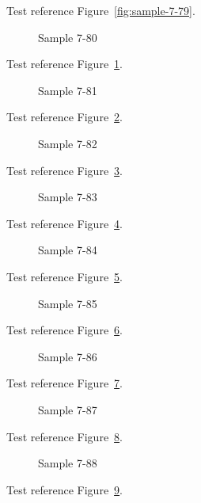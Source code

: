 Test reference Figure~\ref{fig:sample-7-79}.

\begin{figure}[tbhp]
\caption{Sample 7-80}
\label{fig:sample-7-80}
\end{figure}

Test reference Figure~\ref{fig:sample-7-80}.

\begin{figure}[tbhp]
\caption{Sample 7-81}
\label{fig:sample-7-81}
\end{figure}

Test reference Figure~\ref{fig:sample-7-81}.

\begin{figure}[tbhp]
\caption{Sample 7-82}
\label{fig:sample-7-82}
\end{figure}

Test reference Figure~\ref{fig:sample-7-82}.

\begin{figure}[tbhp]
\caption{Sample 7-83}
\label{fig:sample-7-83}
\end{figure}

Test reference Figure~\ref{fig:sample-7-83}.

\begin{figure}[tbhp]
\caption{Sample 7-84}
\label{fig:sample-7-84}
\end{figure}

Test reference Figure~\ref{fig:sample-7-84}.

\begin{figure}[tbhp]
\caption{Sample 7-85}
\label{fig:sample-7-85}
\end{figure}

Test reference Figure~\ref{fig:sample-7-85}.

\begin{figure}[tbhp]
\caption{Sample 7-86}
\label{fig:sample-7-86}
\end{figure}

Test reference Figure~\ref{fig:sample-7-86}.

\begin{figure}[tbhp]
\caption{Sample 7-87}
\label{fig:sample-7-87}
\end{figure}

Test reference Figure~\ref{fig:sample-7-87}.

\begin{figure}[tbhp]
\caption{Sample 7-88}
\label{fig:sample-7-88}
\end{figure}

Test reference Figure~\ref{fig:sample-7-88}.

